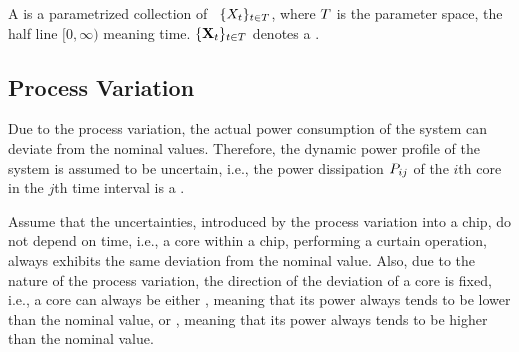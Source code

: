 A  is a parametrized collection of \rvs\ $\{ X_t \}_{t \in T}$, where $T$ is the parameter space, the half line $[0, \infty)$ meaning time. $\{ \mathbf{X}_t \}_{t \in T}$ denotes a .

\subsection{Process Variation} 
Due to the process variation, the actual power consumption of the system can deviate from the nominal values. Therefore, the dynamic power profile of the system is assumed to be uncertain, i.e., the power dissipation $P_{ij}$ of the $i$th core in the $j$th time interval is a \rv.

Assume that the uncertainties, introduced by the process variation into a chip, do not depend on time, i.e., a core within a chip, performing a curtain operation, always exhibits the same deviation from the nominal value. Also, due to the nature of the process variation, the direction of the deviation of a core is fixed, i.e., a core can always be either , meaning that its power always tends to be lower than the nominal value, or , meaning that its power always tends to be higher than the nominal value.
